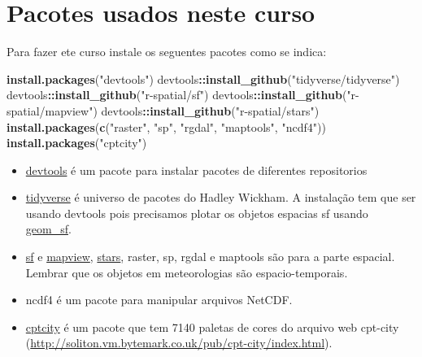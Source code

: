 \documentclass[]{book}
\newenvironment{Shaded}{\begin{snugshade}}{\end{snugshade}}
\newcommand{\KeywordTok}[1]{\textcolor[rgb]{0.13,0.29,0.53}{\textbf{#1}}}
\newcommand{\StringTok}[1]{\textcolor[rgb]{0.31,0.60,0.02}{#1}}
\newcommand{\OperatorTok}[1]{\textcolor[rgb]{0.81,0.36,0.00}{\textbf{#1}}}
\newcommand{\NormalTok}[1]{#1}
\providecommand{\tightlist}{%
  \setlength{\itemsep}{0pt}\setlength{\parskip}{0pt}}
\theoremstyle{definition}
\theoremstyle{definition}
\theoremstyle{definition}
\theoremstyle{remark}
\begin{document}
\section{Pacotes usados neste curso}\label{pacotes-usados-neste-curso}

Para fazer ete curso instale os seguentes pacotes como se indica:

\begin{Shaded}
\begin{Highlighting}[]
\KeywordTok{install.packages}\NormalTok{(}\StringTok{"devtools"}\NormalTok{)}
\NormalTok{devtools}\OperatorTok{::}\KeywordTok{install_github}\NormalTok{(}\StringTok{"tidyverse/tidyverse"}\NormalTok{)}
\NormalTok{devtools}\OperatorTok{::}\KeywordTok{install_github}\NormalTok{(}\StringTok{"r-spatial/sf"}\NormalTok{)}
\NormalTok{devtools}\OperatorTok{::}\KeywordTok{install_github}\NormalTok{(}\StringTok{"r-spatial/mapview"}\NormalTok{)}
\NormalTok{devtools}\OperatorTok{::}\KeywordTok{install_github}\NormalTok{(}\StringTok{"r-spatial/stars"}\NormalTok{)}
\KeywordTok{install.packages}\NormalTok{(}\KeywordTok{c}\NormalTok{(}\StringTok{"raster"}\NormalTok{, }\StringTok{"sp"}\NormalTok{, }\StringTok{"rgdal"}\NormalTok{, }\StringTok{"maptools"}\NormalTok{, }\StringTok{"ncdf4"}\NormalTok{))}
\KeywordTok{install.packages}\NormalTok{(}\StringTok{"cptcity"}\NormalTok{)}
\end{Highlighting}
\end{Shaded}

\begin{itemize}
\tightlist
\item
  \href{https://CRAN.R-project.org/package=devtools}{devtools} é um
  pacote para instalar pacotes de diferentes repositorios
\item
  \href{https://github.com/tidyverse}{tidyverse} é universo de pacotes
  do Hadley Wickham. A instalação tem que ser usando devtools pois
  precisamos plotar os objetos espacias sf usando
  \href{https://www.isgeomsfinggplot2yet.site/}{geom\_sf}.
\item
  \href{https://github.com/r-spatial/sf}{sf} e
  \href{https://github.com/r-spatial/mapbiew}{mapview},
  \href{https://github.com/r-spatial/stars}{stars}, raster, sp, rgdal e
  maptools são para a parte espacial. Lembrar que os objetos em
  meteorologias são espacio-temporais.
\item
  ncdf4 é um pacote para manipular arquivos NetCDF.
\item
  \href{https://ibarraespinosa.github.io/cptcity/}{cptcity} é um pacote
  que tem 7140 paletas de cores do arquivo web cpt-city
  (\url{http://soliton.vm.bytemark.co.uk/pub/cpt-city/index.html}).
\end{itemize}
\end{document}
